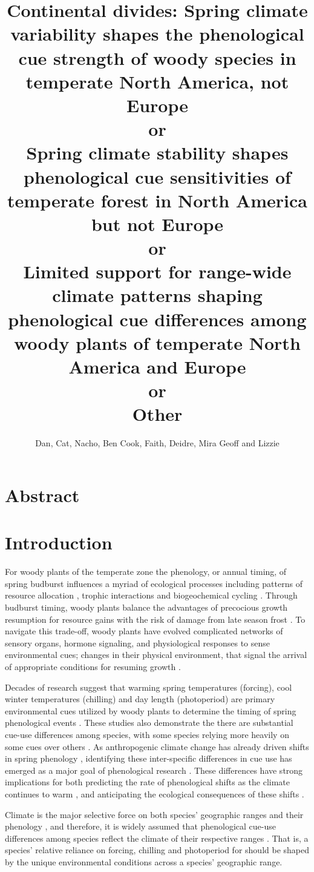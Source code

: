 \documentclass[12pt]{article}\usepackage[]{graphicx}\usepackage[]{color}
\title{Continental divides: Spring climate variability shapes the phenological cue strength of woody species in temperate North America, not Europe\\ or\\
Spring climate stability shapes phenological cue sensitivities of temperate forest in North America but not Europe\\ or\\
Limited support for range-wide climate patterns shaping phenological cue differences among woody plants of temperate North America and Europe \\or\\
Other
}
\author{Dan, Cat, Nacho, Ben Cook, Faith, Deidre, Mira Geoff and Lizzie}
\begin{document}
\maketitle

\section*{Abstract}
\section*{Introduction}
For woody plants of the temperate zone the phenology, or annual timing, of spring budburst influences a myriad of ecological processes including patterns of resource allocation \citep{Seiwa:1991vr}, trophic interactions \citep{Memmott2007} and biogeochemical cycling \citep{Piao2007}.
 Through budburst timing, woody plants balance the advantages of precocious growth resumption for resource gains with the risk of damage from late season frost \citep{Savage:2013aa}. To navigate this trade-off, woody plants have evolved complicated networks of sensory organs, hormone signaling, and physiological responses to sense environmental cues; changes in their physical environment, that signal the arrival of appropriate conditions for resuming growth \citep{Visser2010,}. %

Decades of research suggest that warming spring temperatures (forcing), cool winter temperatures (chilling) and day length (photoperiod) are primary environmental cues utilized by woody plants to determine the timing of spring phenological events \cite{Ettinger:2020aa,Forrest2010}. These studies also demonstrate the there are substantial cue-use differences among species, with some species relying more heavily on some cues over others \citep{Laube:2014aa,}. As anthropogenic climate change has already driven shifts in spring phenology \citep{Menzel2006}, identifying these inter-specific differences in cue use has emerged as a major goal of phenological research \citep{Chuine2002}. These differences have strong implications for both predicting the rate of phenological shifts as the climate continues to warm \citep{?}, and anticipating the ecological consequences of these shifts \citep{Cleland2012}.

Climate is the major selective force on both species' geographic ranges \citep{Morin:2011aa} and their phenology \citep{Savage:2013aa}, and therefore, it is widely assumed that phenological cue-use differences among species reflect the climate of their respective ranges \citep{Zohner:2017aa,Silvestro:2019wa}. That is, a species' relative reliance on forcing, chilling and photoperiod for should be shaped by the unique environmental conditions across a species' geographic range.
\end{document}
